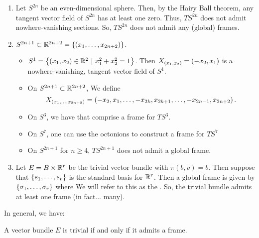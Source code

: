 \documentclass[main.tex]{subfiles}
\begin{document}
 \begin{exmp}
 \begin{enumerate}[1)]
     \item Let $S^{2n}$ be an even-dimensional sphere. Then, by the Hairy Ball theorem, any tangent vector field of $S^{2n}$ has at least one zero. Thus, $TS^{2n}$ does not admit nowhere-vanishing sections. So, $TS^{2n}$ does not admit any (global) frames.
     \item $S^{2n+1} \subset \mathbb{R}^{2n+2} = \left\{ \left( x_1, \dots, x_{2n+2}  \right)\right\}$.
     \begin{itemize}
         \item $S^1 = \left\{(x_1, x_2) \in \mathbb{R}^2 \ | \  x_1^2 + x_2^2 = 1\right\}$. Then $X_{\left( x_1, x_2 \right)} = (-x_2, x_1)$ is a nowhere-vanishing, tangent vector field of $S^1$. 
         \item On $S^{2n+1} \subset \mathbb{R}^{2n+2}$, We define
         \[
         X_{\left( x_1, \dots, x_{2n+2} \right)} = \left(  -x_2, x_1, \dots, -x_{2k}, x_{2k+1}, \dots, -x_{2n-1}, x_{2n+2} \right).
         \]
         \item On $S^3$, we have that
          comprise a frame for $TS^3$. 
         \item On $S^7$, one can use the octonions to construct a frame for $TS^7$
         \item On $S^{2n+1}$ for $n \geq 4$, $TS^{2n+1}$ does not admit a global frame.
     \end{itemize}
     \item Let $E = B \times \mathbb{R}^r$ be the trivial vector bundle with $\pi(b, v) = b$. Then suppose that $\left\{e_1, \dots, e_r\right\}$ is the standard basis for $\mathbb{R}^r$. Then a global frame is given by $\left\{\sigma_1, \dots, \sigma_r\right\}$ where
      We will refer to this as the . So, the trivial bundle admits at least one frame (in fact... many).
 \end{enumerate}
 \end{exmp}
 
 In general, we have:
 
 \begin{prop}
 A vector bundle $E$ is trivial if and only if it admits a frame. 
 \end{prop}
 
\end{document}
